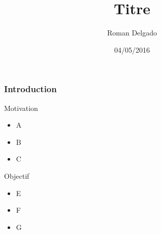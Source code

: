 \documentclass{beamer}
\title{Titre}
\author{Roman Delgado}
\institute[\textsc{Upmc}]{Université Pierre et Marie Curie}
\date{04/05/2016}
\begin{document}
\begin{frame}

\titlepage

\end{frame}


\begin{frame}
  \frametitle{Introduction}

  \begin{block}{Motivation}
    \begin{itemize}
    \item A
    \item B
    \item C
    \end{itemize}
  \end{block}

  \begin{block}{Objectif}
    \begin{itemize}
    \item E
    \item F
    \item G
    \end{itemize}
  \end{block}  

\end{frame}
\newenvironment{bnf}
               {\[\begin{array}{lcl@{\qquad}r}}
               {\end{array}\]}
\end{document}
